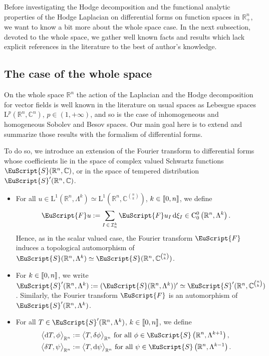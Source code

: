 \documentclass[AHL,Unicode,longabstracts,published]{cedram}
\newcommand{\bbR}{\mathbb{R}}
\newcommand{\bbC}{\mathbb{C}}
\newcommand{\rmd}{\mathrm{d}}
\newcommand{\rmL}{\mathrm{L}}
\newcommand{\rmC}{\mathrm{C}}
\newcommand{\clI}{\mathcal{I}}
\newcommand{\eus}{\EuScript}
\newcommand{\llbracket}{\mathopen{[\mkern -2.7mu[}}
\newcommand{\rrbracket}{\mathclose{]\mkern -2.7mu]}}
\newcommand{\llb}{\llbracket}
\newcommand{\rrb}{\rrbracket}
\begin{document}
Before investigating the Hodge decomposition and the functional analytic properties of the Hodge Laplacian on differential forms on function spaces in $\bbR^n_+$, we want to know a bit more about the whole space case. In the next subsection, devoted to the whole space, we gather well known facts and results which lack explicit references in the literature to the best of author's knowledge.

\subsection{The case of the whole space}

On the whole space $\bbR^n$ the action of the Laplacian and the Hodge decomposition for vector fields is well known in the literature on usual spaces as Lebesgue spaces $\rmL^p(\bbR^n,\bbC^n)$, $p\in(1,+\infty)$, and so is the case of inhomogeneous and homogeneous Sobolev and Besov spaces. Our main goal here is to extend and summarize those results with the formalism of differential forms.

To do so, we introduce an extension of the Fourier transform to differential forms whose coefficients lie in the space of complex valued Schwartz functions $\eus{S}(\bbR^n,\bbC)$, or in the space of tempered distribution $\eus{S}'(\bbR^n,\bbC)$.
\begin{itemize}
\item For all $u\in \rmL^1(\bbR^n,\Lambda^k)\simeq \rmL^1(\bbR^n,\bbC^{\binom{n}{k}})$, $k\in\llb 0,n\rrb$, we define
\begin{align*}
\eus{F}u:=\sum\limits_{I\,\in\,\clI^k_n} \eus{F}u_{I} \,\rmd\xi_I \in \rmC^0_{0}\left(\bbR^n,\Lambda^k\right).
\end{align*}
Hence, as in the scalar valued case, the Fourier transform $\eus{F}$ induces a topological automorphism of $\eus{S}(\bbR^n,\Lambda^k)\simeq \eus{S}(\bbR^n,\bbC^{\binom{n}{k}})$.
\item For $k\in\llb 0,n\rrb$, we write $\eus{S}'(\bbR^n,\Lambda^k):= (\eus{S}(\bbR^n,\Lambda^k))'\simeq \eus{S}'(\bbR^n,\bbC^{\binom{n}{k}})$. Similarly, the Fourier transform $\eus{F}$ is an automorphism of $\eus{S}'(\bbR^n,\Lambda^k)$.
\item For all $T\in \eus{S}'(\bbR^n,\Lambda^k)$, $k\in\llb 0,n\rrb$, we define
\begin{align*}
\big\langle \rmd T, \phi \big\rangle_{\bbR^n} &:= \big\langle T, {\delta}\phi \big\rangle_{\bbR^n} \text{ for all }\phi \in \eus{S}\left(\bbR^{n},\Lambda^{k+1}\right),\\
\big\langle {\delta}T, \psi \big\rangle_{\bbR^n} &:= \big\langle T,\rmd\psi \big\rangle_{\bbR^n} \text{ for all }\psi \in \eus{S}\left(\bbR^{n},\Lambda^{k-1}\right).
\end{align*}
\end{itemize}
\end{document}
